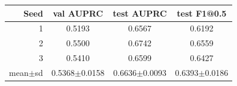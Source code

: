 \begin{tabular}{rccc}
\toprule
Seed & val AUPRC & test AUPRC & test F1@0.5 \\
\midrule
1 & 0.5193 & 0.6567 & 0.6192 \\
2 & 0.5500 & 0.6742 & 0.6559 \\
3 & 0.5410 & 0.6599 & 0.6427 \\
\midrule
mean$\pm$sd & 0.5368$\pm$0.0158 & 0.6636$\pm$0.0093 & 0.6393$\pm$0.0186 \\
\bottomrule
\end{tabular}

